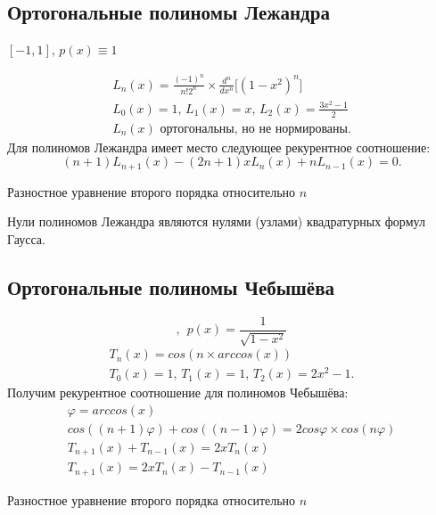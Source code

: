 \documentclass[a4paper,11pt]{article}
\begin{document}
\subsection{Ортогональные полиномы Лежандра}
\begin{center}
  $[-1, 1]$, \hspace{5pt} $p(x) \equiv 1$
\end{center}
\begin{gather*}
  \boxed{L_n(x) = \frac{(-1)^n}{n!2^n} \times \frac{d^n}{dx^n}\bigg[(1-x^2)^n\bigg]} \\
  L_0(x)=1,\, L_1(x)=x,\, L_2(x)=\frac{3x^2-1}{2} \\
  \text{$L_n(x)$ ортогональны, но не нормированы}.
\end{gather*}
Для полиномов Лежандра имеет место следующее рекурентное соотношение:
\begin{equation*}
  (n+1)L_{n+1}(x)-(2n+1)xL_n(x)+nL_{n-1}(x)=0.
\end{equation*}
\begin{center}
  \small{Разностное уравнение второго порядка относительно $n$}
\end{center}
Нули полиномов Лежандра являются нулями (узлами) квадратурных формул Гаусса.

\subsection{Ортогональные полиномы Чебышёва}
\begin{equation*}
  [-1, 1], \hspace{5pt} p(x) = \frac{1}{\sqrt{1-x^2}}
\end{equation*}
\begin{gather*}
  \boxed{T_n(x) = cos(n \times arccos(x))} \\
  T_0(x) = 1,\, T_1(x) = 1,\, T_2(x) = 2x^2-1.
\end{gather*}
Получим рекурентное соотношение для полиномов Чебышёва:
\begin{gather*}
  \varphi = arccos(x) \\
  cos((n+1)\varphi) + cos((n-1)\varphi) = 2cos\varphi \times cos(n\varphi) \\
  T_{n+1}(x) + T_{n-1}(x) = 2xT_n(x) \\
  T_{n+1}(x) = 2xT_n(x) - T_{n-1}(x)
\end{gather*}
\begin{center}
  \small{Разностное уравнение второго порядка относительно $n$}
\end{center}
\end{document}
